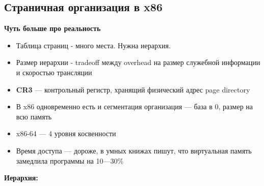 \documentclass[../../lectures.tex]{subfiles}
\begin{document}
\subsection{Страничная организация в x86}
\textbf{Чуть больше про реальность}
\begin{itemize}
    \item Таблица страниц - много места. Нужна иерархия.
    \item Размер иерархии - tradeoff между overhead на размер служебной информации и скоростью трансляции
    \item \textbf{CR3} --- контрольный регистр, хранящий физический адрес page directory
    \item В x86 одновременно есть и сегментация организация --- база в 0, размер на всю память
    \item x86-64 --- 4 уровня косвенности
    \item Время доступа --- дороже, в умных книжах пишут, что виртуальная память замедлила программы на 10---30\%
\end{itemize}
\begin{center}\textbf{Иерархия:}\end{center}
\end{document}
